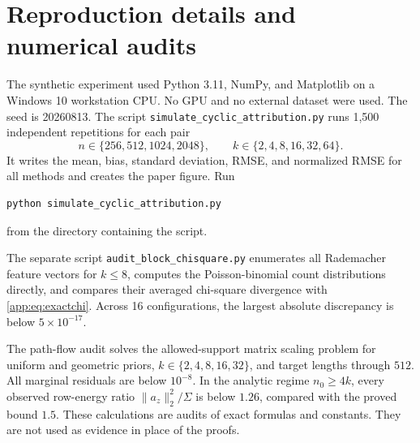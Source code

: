 \section{Reproduction details and numerical audits}

The synthetic experiment used Python 3.11, NumPy, and Matplotlib on a Windows 10 workstation CPU. No GPU and no external dataset were used. The seed is 20260813. The script \texttt{simulate\_cyclic\_attribution.py} runs 1,500 independent repetitions for each pair
\[
 n\in\{256,512,1024,2048\},\qquad
 k\in\{2,4,8,16,32,64\}.
\]
It writes the mean, bias, standard deviation, RMSE, and normalized RMSE for all methods and creates the paper figure. Run
\begin{lstlisting}[basicstyle=\ttfamily\small]
python simulate_cyclic_attribution.py
\end{lstlisting}
from the directory containing the script.

The separate script \texttt{audit\_block\_chisquare.py} enumerates all Rademacher feature vectors for $k\le8$, computes the Poisson-binomial count distributions directly, and compares their averaged chi-square divergence with \eqref{app:eq:exactchi}. Across 16 configurations, the largest absolute discrepancy is below $5\times10^{-17}$.

The path-flow audit solves the allowed-support matrix scaling problem for uniform and geometric priors, $k\in\{2,4,8,16,32\}$, and target lengths through $512$. All marginal residuals are below $10^{-8}$. In the analytic regime $n_0\ge4k$, every observed row-energy ratio $\|a_z\|_2^2/\Sigma$ is below $1.26$, compared with the proved bound $1.5$. These calculations are audits of exact formulas and constants. They are not used as evidence in place of the proofs.
